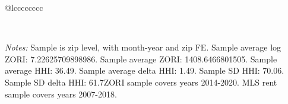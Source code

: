 \begin{table}[H]
{\begin{tabular}{@{\extracolsep{5pt}}lcccccccc}
 \hline  

 \hline \\[-1.8ex]  

  {\parbox[t]{\textwidth}{ \textit{Notes:} Sample is zip level, with month-year and zip FE. Sample average log ZORI: 7.22625709898986. Sample average ZORI: 1408.6466801505. Sample average HHI: 36.49. Sample average delta HHI: 1.49. Sample SD HHI: 70.06. Sample SD delta HHI: 61.7ZORI sample covers years 2014-2020. MLS rent sample covers years 2007-2018.}} \\ 

 \end{tabular}}  

 \end{table}  

 



